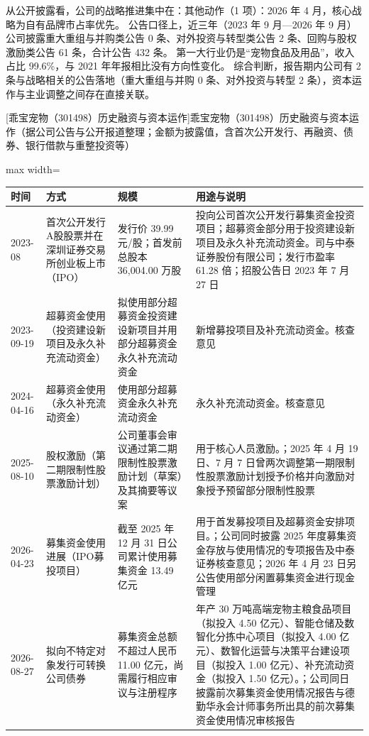  从公开披露看，公司的战略推进集中在：其他动作（1 项）：2026 年 4 月，核心战略为自有品牌市占率优先。 公告口径上，近三年（2023 年 9 月---2026 年 9 月）公司披露重大重组与并购类公告 0 条、对外投资与转型类公告 2 条、回购与股权激励类公告 61 条，合计公告 432 条。 第一大行业仍是“宠物食品及用品”，收入占比 99.6\%，与 2021 年年报相比没有方向性变化。 综合判断，报告期内公司有 2 条与战略相关的公告落地（重大重组与并购 0 条、对外投资与转型 2 条），资本运作与主业调整之间存在直接关联。

\begin{center}\small\setlength{\tabcolsep}{4pt}
[乖宝宠物（301498）历史融资与资本运作]{乖宝宠物（301498）历史融资与资本运作（据公司公告与公开报道整理；金额为披露值，含首次公开发行、再融资、债券、银行借款与重整投资等）}
\begin{adjustbox}{max width=\textwidth}
\begin{tabular}{@{}p{1.45cm}p{2.55cm}p{4.05cm}p{4.95cm}@{}}
\toprule
时间 & 方式 & 规模 & 用途与说明 \\
\midrule
2023-08 & 首次公开发行A股股票并在深圳证券交易所创业板上市（IPO） & 发行价 39.99 元/\allowbreak{}股；首发前总股本 36,\allowbreak{}004.00 万股 & 投向公司首次公开发行募集资金投资项目；超募资金部分用于投资建设新项目及永久补充流动资金。司与中泰证券股份有限公司；发行市盈率 61.28 倍；招股公告日 2023 年 7 月 27 日 \\
2023-09-19 & 超募资金使用（投资建设新项目及永久补充流动资金） & 拟使用部分超募资金投资建设新项目并用部分超募资金永久补充流动资金 & 新增募投项目及补充流动资金。核查意见 \\
2024-04-16 & 超募资金使用（永久补充流动资金） & 使用部分超募资金永久补充流动资金 & 永久补充流动资金。核查意见 \\
2025-08-10 & 股权激励（第二期限制性股票激励计划） & 公司董事会审议通过第二期限制性股票激励计划（草案）及其摘要等议案 & 用于核心人员激励。；2025 年 4 月 19 日、\allowbreak{}7 月 7 日曾两次调整第一期限制性股票激励计划授予价格并向激励对象授予预留部分限制性股票 \\
2026-04-23 & 募集资金使用进展（IPO募投项目） & 截至 2025 年 12 月 31 日公司累计使用募集资金 13.49 亿元 & 用于首发募投项目及超募资金安排项目。；公司同时披露 2025 年度募集资金存放与使用情况的专项报告及中泰证券核查意见；2026 年 4 月 23 日另公告使用部分闲置募集资金进行现金管理 \\
2026-08-27 & 拟向不特定对象发行可转换公司债券 & 募集资金总额不超过人民币 11.00 亿元，\allowbreak{}尚需履行相应审议与注册程序 & 年产 30 万吨高端宠物主粮食品项目（拟投入 4.50 亿元）、\allowbreak{}智能仓储及数智化分拣中心项目（拟投入 4.00 亿元）、\allowbreak{}数智化运营与决策平台建设项目（拟投入 1.00 亿元）、\allowbreak{}补充流动资金（拟投入 1.50 亿元）。；公司同日披露前次募集资金使用情况报告与德勤华永会计师事务所出具的前次募集资金使用情况审核报告 \\
\bottomrule
\end{tabular}
\end{adjustbox}
\end{center}

